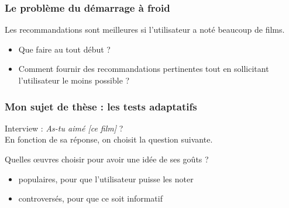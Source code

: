 \documentclass[handout]{beamer}
\begin{document}
\def\R{\mathcal{R}}
\def\N{N}


\begin{frame}
	\frametitle{Le problème du démarrage à froid}
	Les recommandations sont \alert{meilleures} si l'utilisateur a noté \alert{beaucoup} de films.
	\vspace{1cm}
	\pause
	\begin{itemize}
	\item Que faire au tout début ?
	\item Comment fournir des recommandations pertinentes tout en sollicitant l'utilisateur le moins possible ?
	\end{itemize}
\end{frame}

\begin{frame}
	\frametitle{Mon sujet de thèse : les tests adaptatifs}
	Interview : \og \emph{As-tu aimé [ce film]} ? \fg\\
	En fonction de sa réponse, on choisit la question suivante.\vspace{1cm}

	\pause	
	Quelles œuvres choisir pour avoir une idée de ses goûts ?
	\pause
	\begin{itemize}[<+->]
	\item \alert{populaires}, pour que l'utilisateur puisse les noter
	\item \alert{controversés}, pour que ce soit informatif
	\end{itemize}
	\pause
\end{frame}
\end{document}
